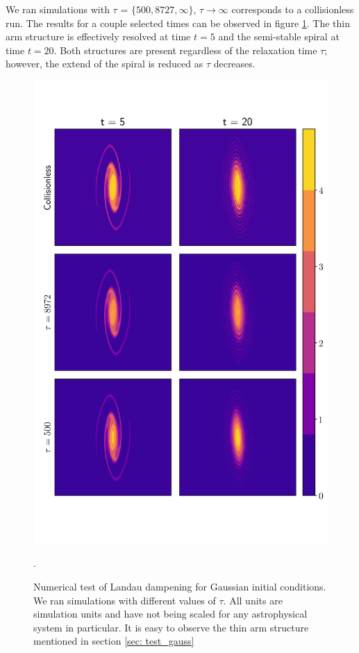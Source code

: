 \documentclass[fleqn,usenatbib]{mnras}
\begin{document}
We ran simulations with $\tau$ = $\{500,8727, \infty\}$, $\tau \rightarrow \infty$ corresponds to a collisionless run.
The results for a couple selected times can be observed in figure \ref{fig: Gauss_test}.
The thin arm structure is effectively resolved at time $t=5$ and the semi-stable spiral at time $t=20$. Both structures are present regardless of the relaxation time $\tau$; however, the extend of the spiral is reduced as $\tau$ decreases.



\begin{figure}
    \includegraphics[scale=0.8]{images/gauss.png} %
    \caption{Numerical test of Landau dampening for Gaussian initial conditions. We ran simulations with different values of $\tau$. All units are simulation units and have not being scaled for any astrophysical system in particular. It is easy to observe the thin arm structure mentioned in section \ref{sec: test_gauss}}.
    \label{fig: Gauss_test}
\end{figure}
\end{document}
